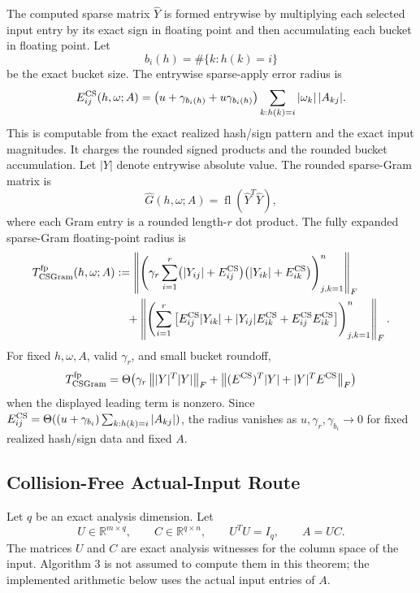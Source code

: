 \documentclass[11pt]{article}
\newcommand{\R}{\mathbb{R}}
\newcommand{\Frob}[1]{\left\lVert #1\right\rVert_F}
\newcommand{\fl}{\operatorname{fl}}
\newcommand{\I}{I}
\theoremstyle{remark}
\begin{document}
The computed sparse matrix \(\widehat Y\) is formed entrywise by multiplying
each selected input entry by its exact sign in floating point and then
accumulating each bucket in floating point.  Let
\[
  b_i(h)=\#\{k:h(k)=i\}
\]
be the exact bucket size.  The entrywise sparse-apply error radius is
\[
  E^{\rm CS}_{ij}(h,\omega;A)
  =
  \bigl(u+\gamma_{b_i(h)}+u\gamma_{b_i(h)}\bigr)
  \sum_{k:h(k)=i}|\omega_k|\,|A_{kj}|.
\]
This is computable from the exact realized hash/sign pattern and the exact
input magnitudes.  It charges the rounded signed products and the rounded
bucket accumulation.  Let \(|Y|\) denote entrywise absolute value.  The rounded
sparse-Gram matrix is
\[
  \widehat G(h,\omega;A)
  =
  \fl\!\left(\widehat Y^T\widehat Y\right),
\]
where each Gram entry is a rounded length-\(r\) dot product.  The fully
expanded sparse-Gram floating-point radius is
\[
\begin{aligned}
  T_{\rm CSGram}^{\rm fp}(h,\omega;A)
  &:=
  \Frob{
    \left(
      \gamma_r
      \sum_{i=1}^{r}
      \bigl(|Y_{ij}|+E^{\rm CS}_{ij}\bigr)
      \bigl(|Y_{ik}|+E^{\rm CS}_{ik}\bigr)
    \right)_{j,k=1}^{n}
  }
  \\
  &\quad+
  \Frob{
    \left(
      \sum_{i=1}^{r}
      \left[
        E^{\rm CS}_{ij}|Y_{ik}|
        +
        |Y_{ij}|E^{\rm CS}_{ik}
        +
        E^{\rm CS}_{ij}E^{\rm CS}_{ik}
      \right]
    \right)_{j,k=1}^{n}
  } .
\end{aligned}
\]
For fixed \(h,\omega,A\), valid \(\gamma_r\), and small bucket roundoff,
\[
  T_{\rm CSGram}^{\rm fp}
  =
  \Theta\!\left(
    \gamma_r\Frob{|Y|^T|Y|}
    +
    \Frob{(E^{\rm CS})^T|Y|+|Y|^TE^{\rm CS}}
  \right)
\]
when the displayed leading term is nonzero.  Since
\(E^{\rm CS}_{ij}=\Theta((u+\gamma_{b_i})\sum_{k:h(k)=i}|A_{kj}|)\), the
radius vanishes as \(u,\gamma_r,\gamma_{b_i}\to0\) for fixed realized
hash/sign data and fixed \(A\).

\subsection*{Collision-Free Actual-Input Route}

Let \(q\) be an exact analysis dimension.  Let
\[
  U\in\R^{m\times q},\qquad C\in\R^{q\times n},
  \qquad U^TU=\I_q,\qquad A=UC .
\]
The matrices \(U\) and \(C\) are exact analysis witnesses for the column space
of the input.  Algorithm 3 is not assumed to compute them in this theorem; the
implemented arithmetic below uses the actual input entries of \(A\).
\end{document}

